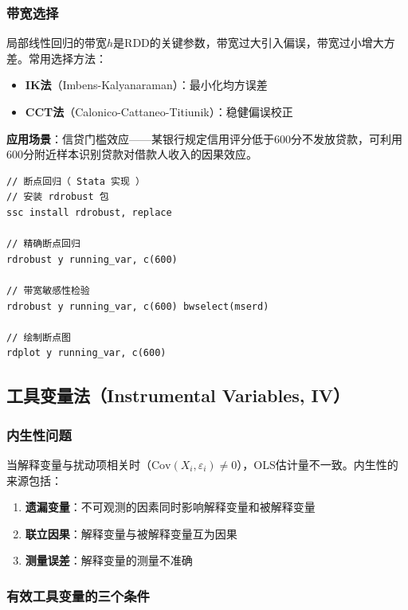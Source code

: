\subsubsection{带宽选择}

局部线性回归的带宽$h$是RDD的关键参数，带宽过大引入偏误，带宽过小增大方差。常用选择方法：

\begin{itemize}[leftmargin=2em]
  \item \textbf{IK法}（Imbens-Kalyanaraman）：最小化均方误差
  \item \textbf{CCT法}（Calonico-Cattaneo-Titiunik）：稳健偏误校正
\end{itemize}

\textbf{应用场景}：信贷门槛效应——某银行规定信用评分低于600分不发放贷款，可利用600分附近样本识别贷款对借款人收入的因果效应。

\begin{lstlisting}[style=stata]
// 断点回归（ Stata 实现 ）
// 安装 rdrobust 包
ssc install rdrobust, replace

// 精确断点回归
rdrobust y running_var, c(600)

// 带宽敏感性检验
rdrobust y running_var, c(600) bwselect(mserd)

// 绘制断点图
rdplot y running_var, c(600)
\end{lstlisting}

\subsection{工具变量法（Instrumental Variables, IV）}

\subsubsection{内生性问题}

当解释变量与扰动项相关时（$\text{Cov}(X_i, \varepsilon_i) \neq 0$），OLS估计量不一致。内生性的来源包括：

\begin{enumerate}[leftmargin=2em]
  \item \textbf{遗漏变量}：不可观测的因素同时影响解释变量和被解释变量
  \item \textbf{联立因果}：解释变量与被解释变量互为因果
  \item \textbf{测量误差}：解释变量的测量不准确
\end{enumerate}

\subsubsection{有效工具变量的三个条件}

